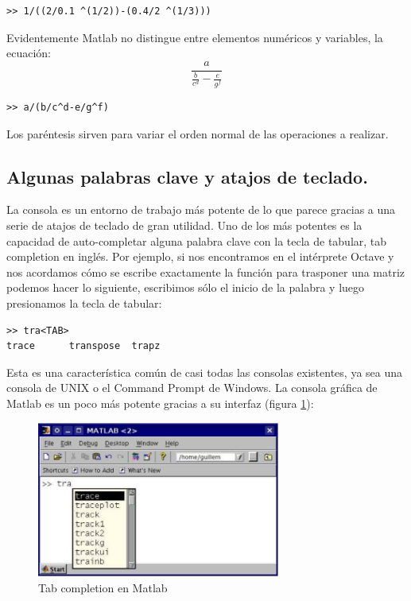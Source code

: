 \begin{verbatim}
>> 1/((2/0.1 ^(1/2))-(0.4/2 ^(1/3)))
\end{verbatim}

Evidentemente Matlab no distingue entre elementos numéricos y
variables, la ecuación:
$$\frac{a}{\frac{b}{c{}^{d}}-\frac{e}{g^{f}}}$$
\begin{verbatim}
>> a/(b/c^d-e/g^f)
\end{verbatim}

Los paréntesis sirven para variar el orden normal de las operaciones a
realizar.


\subsection{Algunas palabras clave y atajos de teclado.}

La consola es un entorno de trabajo más potente de lo que parece
gracias a una serie de atajos de teclado de gran utilidad. Uno de los
más potentes es la capacidad de auto-completar alguna palabra clave
con la tecla de tabular, tab completion en inglés. Por ejemplo, si nos
encontramos en el intérprete Octave y nos acordamos cómo se escribe
exactamente la función para trasponer una matriz podemos hacer lo
siguiente, escribimos sólo el inicio de la palabra y luego presionamos
la tecla de tabular:

\begin{verbatim}
>> tra<TAB>
trace      transpose  trapz
\end{verbatim}

Esta es una característica común de casi todas las consolas
existentes, ya sea una consola de UNIX o el Command Prompt de Windows.
La consola gráfica de Matlab es un poco más potente gracias a su
interfaz (figura \ref{cap:Tab-completion-en}):

%
\begin{figure}[h]
  \centering{}\includegraphics[width=8cm,
  keepaspectratio]{figuras/autocompletion}


  \caption{\label{cap:Tab-completion-en}Tab completion en Matlab}
\end{figure}


